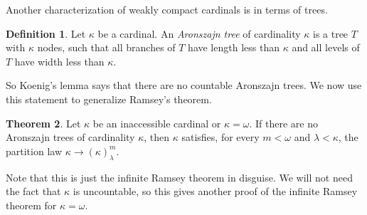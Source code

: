 \documentclass[12pt]{report}
\newcommand{\dfn}[1]{\emph{#1}\index{#1}}
\theoremstyle{definition}
\newtheorem{theorem}{Theorem}[chapter]
\newtheorem{definition}[theorem]{Definition}
\begin{document}
Another characterization of weakly compact cardinals is in terms of trees.
\begin{definition}
Let $\kappa$ be a cardinal.
An \dfn{Aronszajn tree} of cardinality $\kappa$ is a tree $T$ with $\kappa$ nodes, such that all branches of $T$ have length less than $\kappa$ and all levels of $T$ have width less than $\kappa$.
\end{definition}
So Koenig's lemma says that there are no countable Aronszajn trees. We now use this statement to generalize Ramsey's theorem.

\begin{theorem}
\label{tree characterization of weakly compact}
Let $\kappa$ be an inaccessible cardinal or $\kappa = \omega$.
If there are no Aronszajn trees of cardinality $\kappa$, then $\kappa$ satisfies, for every $m < \omega$ and $\lambda < \kappa$, the partition law $\kappa \to (\kappa)^m_\lambda$.
\end{theorem}
Note that this is just the infinite Ramsey theorem in disguise. We will not need the fact that $\kappa$ is uncountable, so this gives another proof of the infinite Ramsey theorem for $\kappa = \omega$.
\end{document}

